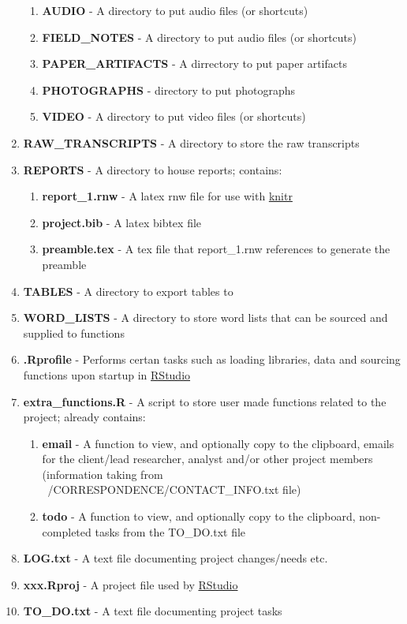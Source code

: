 \documentclass{article}\usepackage{graphicx, color}
\begin{document}
\begin{enumerate}
  \begin{enumerate}
     \item \textbf{AUDIO} - A directory to put audio files (or shortcuts)
     \item \textbf{FIELD\_NOTES} - A directory to put audio files (or shortcuts)
     \item \textbf{PAPER\_ARTIFACTS} - A dirrectory to put paper artifacts 
     \item \textbf{PHOTOGRAPHS} - directory to put photographs
     \item \textbf{VIDEO} - A directory to put video files (or shortcuts)
  \end{enumerate}  
  \item \textbf{RAW\_TRANSCRIPTS} - A directory to store the raw transcripts
  \item \textbf{REPORTS} - A directory to house reports; contains:
  \begin{enumerate}
     \item \textbf{report\_1.rnw} - A latex rnw file for use with \href{http://yihui.name/knitr/}{knitr}
     \item \textbf{project.bib} - A latex bibtex file
     \item \textbf{preamble.tex} - A tex file that report\_1.rnw references to generate the preamble 
  \end{enumerate}  
  \item \textbf{TABLES} - A directory to export tables to 
  \item \textbf{WORD\_LISTS} - A directory to store word lists that can be sourced and supplied to functions
  \item \textbf{.Rprofile} - Performs certan tasks such as loading libraries, 
      data and sourcing functions upon startup in \href{http://www.rstudio.com/}{RStudio}
  \item \textbf{extra\_functions.R} - A script to store user made functions related to the project; already contains:
  \begin{enumerate}
     \item \textbf{email} - A function to view, and optionally copy to the clipboard, emails for the client/lead researcher, analyst and/or other project members (information taking from ~/CORRESPONDENCE/CONTACT\_INFO.txt file)
     \item \textbf{todo} - A function to view, and optionally copy to the clipboard, non-completed tasks from the TO\_DO.txt file
  \end{enumerate}   
  \item \textbf{LOG.txt} - A text file documenting project changes/needs etc.
  \item \textbf{xxx.Rproj} - A project file used by \href{http://www.rstudio.com/}{RStudio}
  \item \textbf{TO\_DO.txt} - A text file documenting project tasks 
\end{enumerate}
\end{document}
